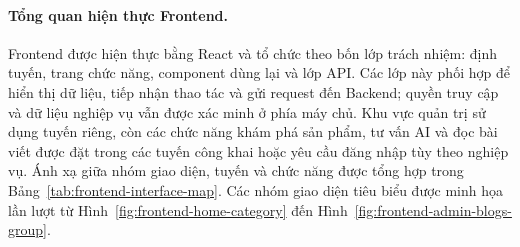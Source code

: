 \newcommand{\frontendsingle}[5]{%
    \begin{figure}[H]
        \centering
        \captionsetup{skip=3pt}
        \begin{minipage}[t]{0.62\textwidth}
            \centering
            \frontendimage{#1}{0.23\textheight}
        \end{minipage}
        \caption{#4}
        \label{#3}
        \label{#5}
    \end{figure}%
}

\paragraph{Tổng quan hiện thực Frontend.}

Frontend được hiện thực bằng React và tổ chức theo bốn lớp trách nhiệm: định tuyến, trang chức năng,
component dùng lại và lớp API. Các lớp này phối hợp để hiển thị dữ liệu, tiếp nhận thao tác và gửi
request đến Backend; quyền truy cập và dữ liệu nghiệp vụ vẫn được xác minh ở phía máy chủ. Khu vực
quản trị sử dụng tuyến riêng, còn các chức năng khám phá sản phẩm, tư vấn AI và đọc bài viết được
đặt trong các tuyến công khai hoặc yêu cầu đăng nhập tùy theo nghiệp vụ.
Ánh xạ giữa nhóm giao diện, tuyến và chức năng được tổng hợp trong
Bảng~\ref{tab:frontend-interface-map}.
Các nhóm giao diện tiêu biểu được minh họa lần lượt từ
Hình~\ref{fig:frontend-home-category} đến Hình~\ref{fig:frontend-admin-blogs-group}.

